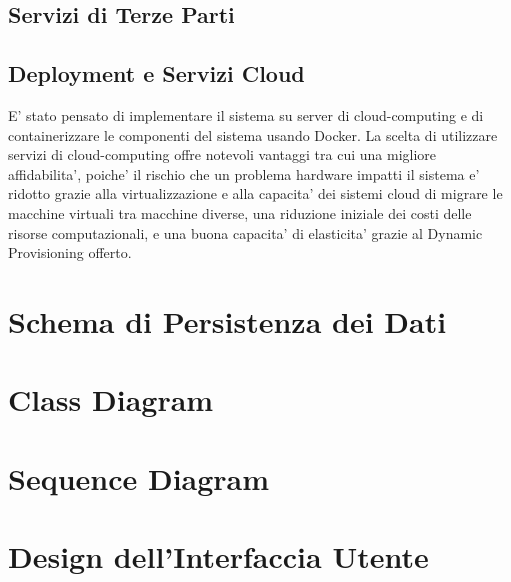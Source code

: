 \subsection{Servizi di Terze Parti}
\subsection{Deployment e Servizi Cloud}
E' stato pensato di implementare il sistema su server di cloud-computing e di containerizzare le componenti del sistema usando Docker. La scelta di utilizzare servizi di cloud-computing offre notevoli vantaggi tra cui una migliore affidabilita', poiche' il rischio che un problema hardware impatti il sistema e' ridotto grazie alla virtualizzazione e alla capacita' dei sistemi cloud di migrare le macchine virtuali tra macchine diverse, una riduzione iniziale dei costi delle risorse computazionali, e una buona capacita' di elasticita' grazie al Dynamic Provisioning offerto.




\section{Schema di Persistenza dei Dati}
\section{Class Diagram}
\section{Sequence Diagram}
\section{Design dell'Interfaccia Utente}
